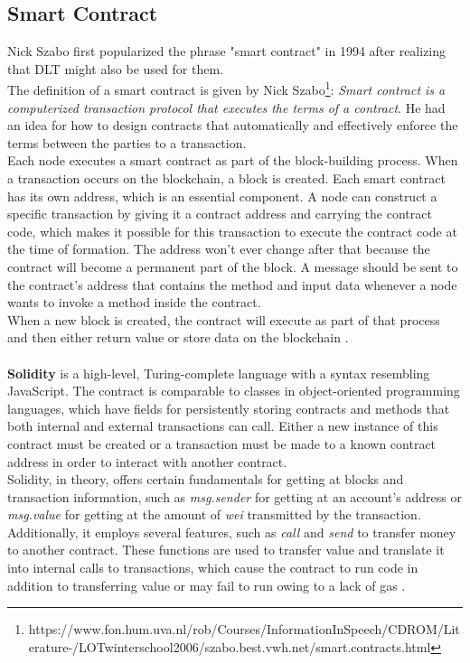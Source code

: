 \subsection{Smart Contract}
Nick Szabo \cite{Szabo} first popularized the phrase "smart contract" in 1994 after realizing that DLT might also be used for them. \\
The definition of a smart contract is given by Nick Szabo\footnote{https://www.fon.hum.uva.nl/rob/Courses/InformationInSpeech/CDROM/Literature-\break /LOTwinterschool2006/szabo.best.vwh.net/smart.contracts.html}: \textit{Smart contract is a computerized transaction protocol that executes the terms of a contract}. He had an idea for how to design contracts that automatically and effectively enforce the terms between the parties to a transaction. \\
Each node executes a smart contract as part of the block-building process. When a transaction occurs on the blockchain, a block is created.
Each smart contract has its own address, which is an essential component. A node can construct a specific transaction by giving it a contract address and carrying the contract code, which makes it possible for this transaction to execute the contract code at the time of formation.
The address won't ever change after that because the contract will become a permanent part of the block. A message should be sent to the contract's address that contains the method and input data whenever a node wants to invoke a method inside the contract. \\
When a new block is created, the contract will execute as part of that process and then either return value or store data on the blockchain \cite{Payrott}.\\
\\
\textbf{Solidity} is a high-level, Turing-complete language with a syntax resembling JavaScript. The contract is comparable to classes in object-oriented programming languages, which have fields for persistently storing contracts and methods that both internal and external transactions can call. Either a new instance of this contract must be created or a transaction must be made to a known contract address in order to interact with another contract.\\
Solidity, in theory, offers certain fundamentals for getting at blocks and transaction information, such as \textit{msg.sender} for getting at an account's address or \textit{msg.value} for getting at the amount of \textit{wei} transmitted by the transaction. Additionally, it employs several features, such as \textit{call} and \textit{send} to transfer money to another contract. These functions are used to transfer value and translate it into internal calls to transactions, which cause the contract to run code in addition to transferring value or may fail to run owing to a lack of gas \cite{Ilya}.